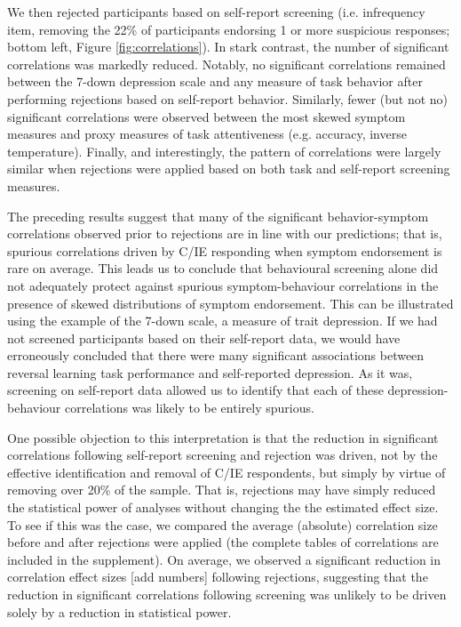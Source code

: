 \documentclass[a4paper,notitlepage,12pt]{article}
\begin{document}
We then rejected participants based on self-report screening  (i.e. infrequency item, removing the 22\% of participants endorsing 1 or more suspicious responses; bottom left, Figure \ref{fig:correlations}). In stark contrast, the number of significant correlations was markedly reduced. Notably, no significant correlations remained between the 7-down depression scale and any measure of task behavior after performing rejections based on self-report behavior. Similarly, fewer (but not no) significant correlations were observed between the most skewed symptom measures and proxy measures of task attentiveness (e.g. accuracy, inverse temperature). Finally, and interestingly, the pattern of correlations were largely similar when rejections were applied based on both task and self-report screening measures. 

The preceding results suggest that many of the significant behavior-symptom correlations observed prior to rejections are in line with our predictions; that is, spurious correlations driven by C/IE responding when symptom endorsement is rare on average. This leads us to conclude that behavioural screening alone did not adequately protect against spurious symptom-behaviour correlations in the presence of skewed distributions of symptom endorsement. This can be illustrated using the example of the 7-down scale, a measure of trait depression. If we had not screened participants based on their self-report data, we would have erroneously concluded that there were many significant associations between reversal learning task performance and self-reported depression. As it was, screening on self-report data allowed us to identify that each of these depression-behaviour correlations was likely to be entirely spurious.

One possible objection to this interpretation is that the reduction in significant correlations following self-report screening and rejection was driven, not by the effective identification and removal of C/IE respondents, but simply by virtue of removing over 20\% of the sample. That is, rejections may have simply reduced the statistical power of analyses without changing the the estimated effect size. To see if this was the case, we compared the average (absolute) correlation size before and after rejections were applied (the complete tables of correlations are included in the supplement). On average, we observed a significant reduction in correlation effect sizes [add numbers] following rejections, suggesting that the reduction in significant correlations following screening was unlikely to be driven solely by a reduction in statistical power. 
\end{document}
